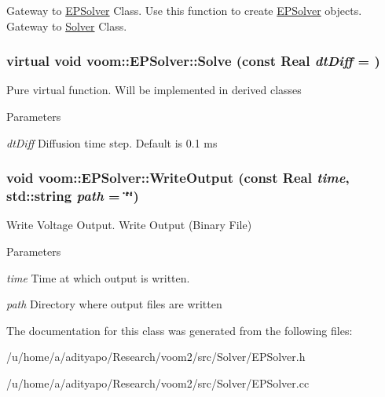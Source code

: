 Gateway to \hyperlink{classvoom_1_1_e_p_solver}{EPSolver} Class. Use this function to create \hyperlink{classvoom_1_1_e_p_solver}{EPSolver} objects. Gateway to \hyperlink{classvoom_1_1_solver}{Solver} Class. \hypertarget{classvoom_1_1_e_p_solver_a4eedcdb113d7c15df7b23dd69dc46e0e}{
\subsubsection[{Solve}]{\setlength{\rightskip}{0pt plus 5cm}virtual void voom::EPSolver::Solve (const Real {\em dtDiff} = {})}}
\label{classvoom_1_1_e_p_solver_a4eedcdb113d7c15df7b23dd69dc46e0e}
Pure virtual function. Will be implemented in derived classes 
\begin{DoxyParams}{Parameters}
\item[{\em dtDiff}]Diffusion time step. Default is 0.1 ms \end{DoxyParams}
\hypertarget{classvoom_1_1_e_p_solver_a22722e9e010bbf7f3eff3bddfac65d26}{
\subsubsection[{WriteOutput}]{\setlength{\rightskip}{0pt plus 5cm}void voom::EPSolver::WriteOutput (const Real {\em time}, \/  std::string {\em path} = {\ttfamily \char`\"{}\char`\"{}})}}
\label{classvoom_1_1_e_p_solver_a22722e9e010bbf7f3eff3bddfac65d26}


Write Voltage Output. Write Output (Binary File) 
\begin{DoxyParams}{Parameters}
\item[{\em time}]Time at which output is written. \item[{\em path}]Directory where output files are written \end{DoxyParams}


The documentation for this class was generated from the following files:\begin{DoxyCompactItemize}
\item 
/u/home/a/adityapo/Research/voom2/src/Solver/EPSolver.h\item 
/u/home/a/adityapo/Research/voom2/src/Solver/EPSolver.cc\end{DoxyCompactItemize}
